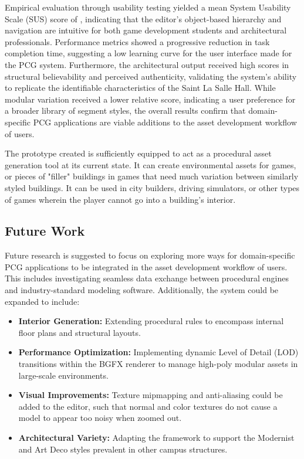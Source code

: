 \documentclass[manuscript,screen,12pt]{article}
\begin{document}
Empirical evaluation through usability testing yielded a mean System Usability Scale (SUS) score of \susScore, indicating that the editor's object-based hierarchy and navigation are intuitive for both game development students and architectural professionals. Performance metrics showed a progressive reduction in task completion time, suggesting a low learning curve for the user interface made for the PCG system. Furthermore, the architectural output received high scores in structural believability and perceived authenticity, validating the system's ability to replicate the identifiable characteristics of the Saint La Salle Hall. While modular variation received a lower relative score, indicating a user preference for a broader library of segment styles, the overall results confirm that domain-specific PCG applications are viable additions to the asset development workflow of users.

The prototype created is sufficiently equipped to act as a procedural asset generation tool at its current state. It can create environmental assets for games, or pieces of "filler" buildings in games that need much variation between similarly styled buildings. It can be used in city builders, driving simulators, or other types of games wherein the player cannot go into a building's interior.

\subsection{Future Work}
Future research is suggested to focus on exploring more ways for domain-specific PCG applications to be integrated in the asset development workflow of users. This includes investigating seamless data exchange between procedural engines and industry-standard modeling software. Additionally, the system could be expanded to include:
\begin{itemize}
	\item \textbf{Interior Generation:} Extending procedural rules to encompass internal floor plans and structural layouts.
	\item \textbf{Performance Optimization:} Implementing dynamic Level of Detail (LOD) transitions within the BGFX renderer to manage high-poly modular assets in large-scale environments.
	\item \textbf{Visual Improvements:} Texture mipmapping and anti-aliasing could be added to the editor, such that normal and color textures do not cause a model to appear too noisy when zoomed out.
	\item \textbf{Architectural Variety:} Adapting the framework to support the Modernist and Art Deco styles prevalent in other campus structures.
\end{itemize}
\end{document}
